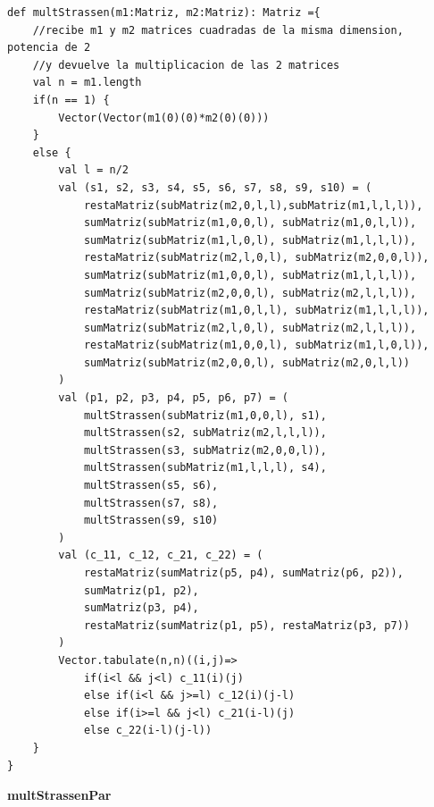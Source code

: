 \documentclass[12pt, a4paper]{article}
\begin{document}
\begin{lstlisting}[caption=mult Strassen, label=lst:scala_cod10]
def multStrassen(m1:Matriz, m2:Matriz): Matriz ={
    //recibe m1 y m2 matrices cuadradas de la misma dimension, potencia de 2
    //y devuelve la multiplicacion de las 2 matrices
    val n = m1.length
    if(n == 1) {
        Vector(Vector(m1(0)(0)*m2(0)(0)))
    }
    else {           
        val l = n/2
        val (s1, s2, s3, s4, s5, s6, s7, s8, s9, s10) = (
            restaMatriz(subMatriz(m2,0,l,l),subMatriz(m1,l,l,l)),
            sumMatriz(subMatriz(m1,0,0,l), subMatriz(m1,0,l,l)),
            sumMatriz(subMatriz(m1,l,0,l), subMatriz(m1,l,l,l)),
            restaMatriz(subMatriz(m2,l,0,l), subMatriz(m2,0,0,l)),
            sumMatriz(subMatriz(m1,0,0,l), subMatriz(m1,l,l,l)),
            sumMatriz(subMatriz(m2,0,0,l), subMatriz(m2,l,l,l)),
            restaMatriz(subMatriz(m1,0,l,l), subMatriz(m1,l,l,l)),
            sumMatriz(subMatriz(m2,l,0,l), subMatriz(m2,l,l,l)),
            restaMatriz(subMatriz(m1,0,0,l), subMatriz(m1,l,0,l)),
            sumMatriz(subMatriz(m2,0,0,l), subMatriz(m2,0,l,l))
        )
        val (p1, p2, p3, p4, p5, p6, p7) = (
            multStrassen(subMatriz(m1,0,0,l), s1),
            multStrassen(s2, subMatriz(m2,l,l,l)),
            multStrassen(s3, subMatriz(m2,0,0,l)),
            multStrassen(subMatriz(m1,l,l,l), s4),
            multStrassen(s5, s6),
            multStrassen(s7, s8),
            multStrassen(s9, s10)
        )
        val (c_11, c_12, c_21, c_22) = (
            restaMatriz(sumMatriz(p5, p4), sumMatriz(p6, p2)),
            sumMatriz(p1, p2),
            sumMatriz(p3, p4),
            restaMatriz(sumMatriz(p1, p5), restaMatriz(p3, p7))
        )
        Vector.tabulate(n,n)((i,j)=>
            if(i<l && j<l) c_11(i)(j)
            else if(i<l && j>=l) c_12(i)(j-l)
            else if(i>=l && j<l) c_21(i-l)(j)
            else c_22(i-l)(j-l))
    }
}
\end{lstlisting}
\textbf{{multStrassenPar}} \\ \\
\end{document}
